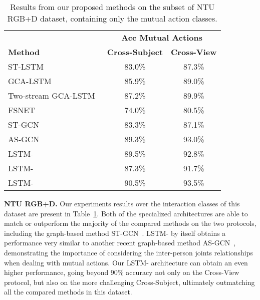 \documentclass[journal,twoside]{IEEEtran}
\renewcommand{\arraystretch}{1.2}
\begin{document}
\begin{table}[ht]
	\begin{center}
	\setlength{\tabcolsep}{1em}
	\renewcommand{\arraystretch}{1.4} \caption{Results from our proposed methods on the subset of NTU RGB+D dataset, containing only the mutual action classes.}
	\begin{tabular}{lcc} 		\toprule
		& \multicolumn{2}{c}{\textbf{Acc Mutual Actions}} \\
		\textbf{Method} & \textbf{Cross-Subject} & \textbf{Cross-View} \\
		\midrule
		ST-LSTM~\cite{Liu2016a}    				& 83.0\% & 87.3\% \\ 
		GCA-LSTM~\cite{Liu2017c}    			& 85.9\% & 89.0\% \\ 
		Two-stream GCA-LSTM~\cite{Liu2018}      & 87.2\% & 89.9\% \\
		FSNET~\cite{Liu2019c}					& 74.0\% & 80.5\% \\
		ST-GCN~\cite{Yan2018a}		            & 83.3\% & 87.1\% \\
		AS-GCN~\cite{Li2019}			        & 89.3\% & 93.0\% \\
		\midrule
		LSTM-         				& 89.5\% & 92.8\% \\
		LSTM-         				& 87.3\% & 91.7\% \\
		LSTM-				& 90.5\% & 93.5\% \\ 
		\bottomrule
	\end{tabular}
	\label{tab:ntu_inter}
	\end{center}
\end{table}


\textbf{NTU RGB+D.}\quad 
Our experiments results over the interaction classes of this dataset are present in Table~\ref{tab:ntu_inter}.
Both of the specialized architectures are able to match or outperform the majority of the compared methods on the two protocols, including the graph-based method ST-GCN~\cite{Yan2018a}. 
LSTM- by itself obtains a performance very similar to another recent graph-based method AS-GCN~\cite{Li2019}, demonstrating the importance of considering the inter-person joints relationships when dealing with mutual actions.
Our LSTM- architecture can obtain an even higher performance, going beyond 90\% accuracy not only on the Cross-View protocol, but also on the more challenging Cross-Subject, ultimately outmatching all the compared methods in this dataset.
\end{document}
